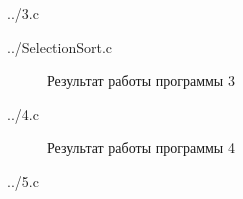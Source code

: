 \documentclass[a4paper,oneside,14pt]{extreport}
\begin{document}
\newpage
\begin{lstinputlisting}[
	caption={Программа 3},
	label={list3},
	style={c},
	]{../3.c}
\end{lstinputlisting}

\newpage
\begin{lstinputlisting}[
	caption={Программа sort для потомка},
	label={SelectionSortList},
	style={c},
	]{../SelectionSort.c}
\end{lstinputlisting}

\begin{figure}[h]
	\caption{Результат работы программы 3}
	\label{3.1png}
\end{figure}

\newpage
\begin{lstinputlisting}[
	caption={Программа 4},
	label={list4},
	style={c},
	]{../4.c}
\end{lstinputlisting}

\newpage
\begin{figure}[h]
	\caption{Результат работы программы 4}
	\label{4.1png}
\end{figure}

\newpage
\begin{lstinputlisting}[
	caption={Программа 5},
	label={list5},
	style={c},
	]{../5.c}
\end{lstinputlisting}
\end{document}

